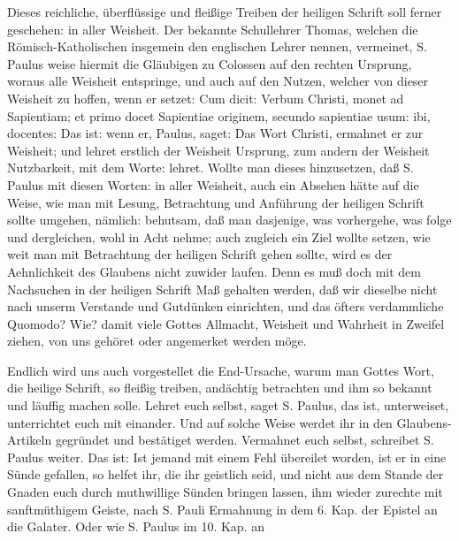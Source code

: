 Dieses reichliche, überflüssige und fleißige Treiben der heiligen Schrift soll ferner geschehen: in aller Weisheit. Der bekannte Schullehrer Thomas, welchen die Römisch-Katholischen insgemein den englischen Lehrer nennen, vermeinet, S. Paulus weise hiermit die Gläubigen zu Colossen auf den rechten Ursprung, woraus alle Weisheit entspringe, und auch auf den Nutzen, welcher von dieser Weisheit zu hoffen, wenn er setzet: Cum dicit: Verbum Christi, monet ad Sapientiam; et primo docet Sapientiae originem, secundo sapientiae usum: ibi, docentes: Das ist: wenn er, Paulus, saget: Das Wort Christi, ermahnet er zur Weisheit; und lehret erstlich der Weisheit Ursprung, zum andern der Weisheit Nutzbarkeit, mit dem Worte: lehret. Wollte man dieses hinzusetzen, daß S. Paulus mit diesen Worten: in aller Weisheit, auch ein Absehen hätte auf die Weise, wie man mit Lesung, Betrachtung und Anführung der heiligen Schrift sollte umgehen, nämlich: behutsam, daß man dasjenige, was vorhergehe, was folge und dergleichen, wohl in Acht nehme; auch zugleich ein Ziel wollte setzen, wie weit man mit Betrachtung der heiligen Schrift gehen sollte, wird es der Aehnlichkeit des Glaubens nicht zuwider laufen. Denn es muß doch mit dem Nachsuchen in der heiligen Schrift Maß gehalten werden, daß wir dieselbe nicht nach unserm Verstande und Gutdünken einrichten, und das öfters verdammliche Quomodo? Wie? damit viele Gottes Allmacht, Weisheit und Wahrheit in Zweifel ziehen, von uns gehöret oder angemerket werden möge.

Endlich wird uns auch vorgestellet die End-Ursache, warum man Gottes Wort, die heilige Schrift, so fleißig treiben, andächtig betrachten und ihm so bekannt und läuffig machen solle. Lehret euch selbst, saget S. Paulus, das ist, unterweiset, unterrichtet euch mit einander. Und auf solche Weise werdet ihr in den Glaubens-Artikeln gegründet und bestätiget werden. Vermahnet euch selbst, schreibet S. Paulus weiter. Das ist: Ist jemand mit einem Fehl übereilet worden, ist er in eine Sünde gefallen, so helfet ihr, die ihr geistlich seid, und nicht aus dem Stande der Gnaden euch durch muthwillige Sünden bringen lassen, ihm wieder zurechte mit sanftmüthigem Geiste, nach S. Pauli Ermahnung in dem 6. Kap. der Epistel an die Galater. Oder wie S. Paulus im 10. Kap. an


